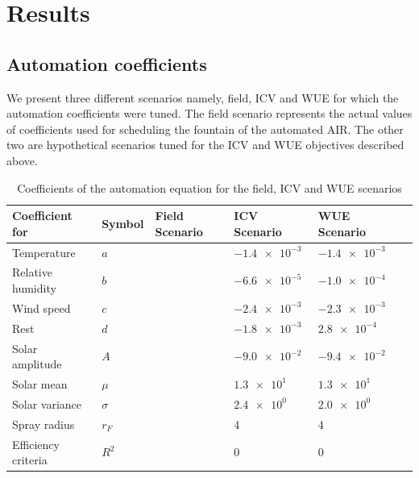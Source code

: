 \documentclass[tc, manuscript]{copernicus}
\begin{document}
\section{Results}

\subsection{Automation coefficients}

We present three different scenarios namely, field, ICV and WUE for which the automation coefficients were
tuned. The field scenario represents the actual values of coefficients used for scheduling the fountain of the
automated AIR. The other two are hypothetical scenarios tuned for the ICV and WUE objectives described above.

\begin{table}[]
\centering
\caption{Coefficients of the automation equation for the field, ICV and WUE scenarios}
\label{tab:assumptions}
\begin{tabular}{@{}llllll@{}}
\toprule
\textbf{Coefficient for} & \textbf{Symbol} & \textbf{Field Scenario} & \textbf{ICV Scenario} & \textbf{WUE
Scenario} & \\ \midrule
\multicolumn{1}{|l}{Temperature}       &$a$  & & $\num{-1.4 e-3}$ & $\num{-1.4 e-3}$ & \multicolumn{1}{l|}{} \\ \midrule
\multicolumn{1}{|l}{Relative humidity}      &$b$  & & $\num{-6.6 e-5}$ & $\num{-1.0 e-4}$ & \multicolumn{1}{l|}{} \\ \midrule
\multicolumn{1}{|l}{Wind speed}      &$c$  & & $\num{-2.4 e-3}$ & $\num{-2.3 e-3}$ & \multicolumn{1}{l|}{} \\ \midrule
\multicolumn{1}{|l}{Rest}      &$d$  & & $\num{-1.8 e-3}$ & $\num{2.8 e-4}$ & \multicolumn{1}{l|}{} \\ \midrule
\multicolumn{1}{|l}{Solar amplitude}      &$A$  & & $\num{-9.0 e-2}$ & $\num{-9.4 e-2}$ & \multicolumn{1}{l|}{} \\ \midrule
\multicolumn{1}{|l}{Solar mean}    &$\mu$  & & $\num{1.3 e+1}$  & $\num{1.3 e+1}$ & \multicolumn{1}{l|}{} \\ \midrule
\multicolumn{1}{|l}{Solar variance} &$\sigma$  & & $\num{2.4 e+0}$  & $\num{2.0 e+0}$ & \multicolumn{1}{l|}{} \\ \midrule
\multicolumn{1}{|l}{Spray radius} &$r_F$ & & 4 & 4 & \multicolumn{1}{l|}{} \\ \midrule
\multicolumn{1}{|l}{Efficiency criteria} &$R^2$ & & 0 & 0 & \multicolumn{1}{l|}{} \\ \bottomrule
\end{tabular}
\end{table}
\end{document}
